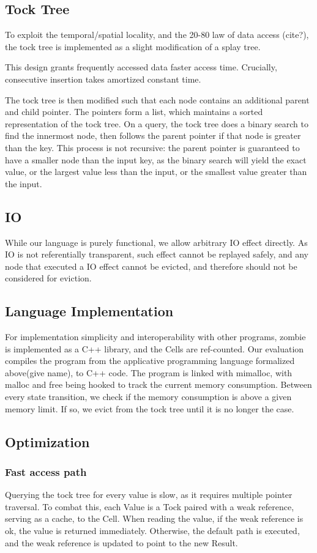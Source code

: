 \subsection{Tock Tree}
To exploit the temporal/spatial locality, and the 20-80 law of data access (cite?), the tock tree is implemented as a slight modification of a splay tree.

This design grants frequently accessed data faster access time. Crucially, consecutive insertion takes amortized constant time.

The tock tree is then modified such that each node contains an additional parent and child pointer. The pointers form a list, which maintains a sorted representation of the tock tree. On a query, the tock tree does a binary search to find the innermost node, then follows the parent pointer if that node is greater than the key. This process is not recursive: the parent pointer is guaranteed to have a smaller node than the input key, as the binary search will yield the exact value, or the largest value less than the input, or the smallest value greater than the input.
\subsection{IO}
While our language is purely functional, we allow arbitrary IO effect directly. As IO is not referentially transparent, such effect cannot be replayed safely, and any node that executed a IO effect cannot be evicted, and therefore should not be considered for eviction.
\subsection{Language Implementation}
For implementation simplicity and interoperability with other programs, zombie is implemented as a C++ library, and the Cells are ref-counted. Our evaluation compiles the program from the applicative programming language formalized above(give name), to C++ code. The program is linked with mimalloc, with malloc and free being hooked to track the current memory consumption. Between every state transition, we check if the memory consumption is above a given memory limit. If so, we evict from the tock tree until it is no longer the case.
\subsection{Optimization}
\subsubsection{Fast access path}
Querying the tock tree for every value is slow, as it requires multiple pointer traversal.
To combat this, each Value is a Tock paired with a weak reference, serving as a cache, to the Cell. When reading the value, if the weak reference is ok, the value is returned immediately. Otherwise, the default path is executed, and the weak reference is updated to point to the new Result.
